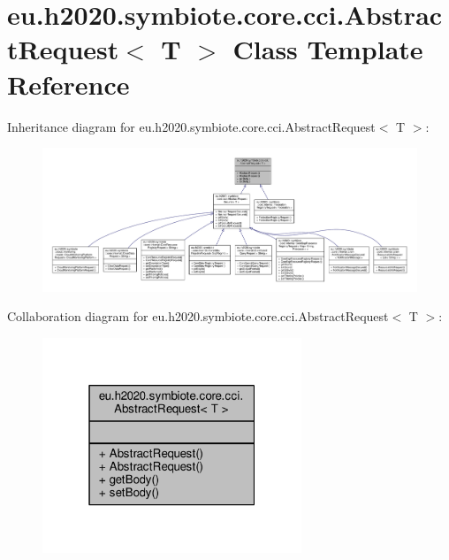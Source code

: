 \hypertarget{classeu_1_1h2020_1_1symbiote_1_1core_1_1cci_1_1AbstractRequest}{}\section{eu.\+h2020.\+symbiote.\+core.\+cci.\+Abstract\+Request$<$ T $>$ Class Template Reference}
\label{classeu_1_1h2020_1_1symbiote_1_1core_1_1cci_1_1AbstractRequest}


Inheritance diagram for eu.\+h2020.\+symbiote.\+core.\+cci.\+Abstract\+Request$<$ T $>$\+:
\nopagebreak
\begin{figure}[H]
\begin{center}
\leavevmode
\includegraphics[width=350pt]{classeu_1_1h2020_1_1symbiote_1_1core_1_1cci_1_1AbstractRequest__inherit__graph}
\end{center}
\end{figure}


Collaboration diagram for eu.\+h2020.\+symbiote.\+core.\+cci.\+Abstract\+Request$<$ T $>$\+:
\nopagebreak
\begin{figure}[H]
\begin{center}
\leavevmode
\includegraphics[width=220pt]{classeu_1_1h2020_1_1symbiote_1_1core_1_1cci_1_1AbstractRequest__coll__graph}
\end{center}
\end{figure}
